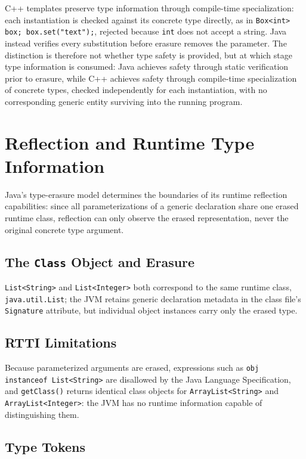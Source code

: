 \documentclass[11pt]{report}
\begin{document}
C++ templates preserve type information through compile-time specialization:
each instantiation is checked against its concrete type directly, as in
\texttt{Box<int> box; box.set("text");}, rejected because \texttt{int} does
not accept a string. Java instead verifies every substitution before
erasure removes the parameter. The distinction is therefore not whether
type safety is provided, but at which stage type information is
consumed: Java achieves safety through static verification prior to
erasure, while C++ achieves safety through compile-time specialization of
concrete types, checked independently for each instantiation, with no
corresponding generic entity surviving into the running program.


\section{Reflection and Runtime Type Information}
\label{JavaGenerics:Reflection}
Java's type-erasure model determines the boundaries of its runtime
reflection capabilities: since all parameterizations of a generic
declaration share one erased runtime class, reflection can only observe
the erased representation, never the original concrete type argument.

\subsection{The \texttt{Class} Object and Erasure}

\texttt{List<String>} and \texttt{List<Integer>} both correspond to the
same runtime class, \texttt{java.util.List}; the JVM retains generic
declaration metadata in the class file's \texttt{Signature} attribute, but
individual object instances carry only the erased type.

\subsection{RTTI Limitations}

Because parameterized arguments are erased, expressions such as
\texttt{obj instanceof List<String>} are disallowed by the Java Language
Specification, and \texttt{getClass()} returns identical class objects for
\texttt{ArrayList<String>} and \texttt{ArrayList<Integer>}: the JVM has no
runtime information capable of distinguishing them.

\subsection{Type Tokens}
\end{document}
